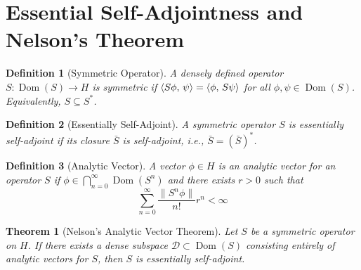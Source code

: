 \documentclass{article}
\newcommand{\tmem}[1]{{\em #1\/}}
\newcommand{\tmop}[1]{\ensuremath{\operatorname{#1}}}
\newtheorem{definition}{Definition}
\newtheorem{theorem}{Theorem}
\newcommand{\1}{\mathbbm{1}}
\newcommand{\ip}[2]{\left\langle #1, \hspace{0.17em} #2  \right\rangle}
\newcommand{\norm}[1]{\left\lVert #1  \right\rVert}
\newcommand{\Dom}{\tmop{Dom}}
\begin{document}
\section{Essential Self-Adjointness and Nelson's Theorem}

\begin{definition}
  [Symmetric Operator] A densely defined operator $S : \Dom (S) \to H$ is
  {\tmem{symmetric}} if $\ip{S \phi}{\psi} = \ip{\phi}{S \psi}$ for all $\phi,
  \psi \in \Dom (S)$. Equivalently, $S \subseteq S^{\ast}$.
\end{definition}

\begin{definition}
  [Essentially Self-Adjoint] A symmetric operator $S$ is {\tmem{essentially
  self-adjoint}} if its closure $\bar{S}$ is self-adjoint, i.e., $\bar{S} =
  (\bar{S})^{\ast}$.
\end{definition}

\begin{definition}
  [Analytic Vector] A vector $\phi \in H$ is an {\tmem{analytic vector}} for
  an operator $S$ if $\phi \in \bigcap_{n = 0}^{\infty} \Dom (S^n)$ and there
  exists $r > 0$ such that
  \begin{equation}
    \sum_{n = 0}^{\infty} \frac{\norm{S^n \phi}}{n!} r^n < \infty
  \end{equation}
\end{definition}

\begin{theorem}
  [Nelson's Analytic Vector Theorem]\label{thm:nelson} Let $S$ be a symmetric
  operator on $H$. If there exists a dense subspace $\mathcal{D} \subset \Dom
  (S)$ consisting entirely of analytic vectors for $S$, then $S$ is
  essentially self-adjoint.
\end{theorem}
\end{document}
